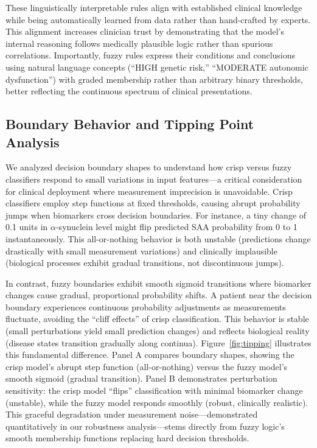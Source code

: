 \documentclass[conference]{IEEEtran}
\begin{document}
These linguistically interpretable rules align with established clinical knowledge while being automatically learned from data rather than hand-crafted by experts. This alignment increases clinician trust \cite{torres2006fuzzy} by demonstrating that the model's internal reasoning follows medically plausible logic rather than spurious correlations. Importantly, fuzzy rules express their conditions and conclusions using natural language concepts (``HIGH genetic risk,'' ``MODERATE autonomic dysfunction'') with graded membership rather than arbitrary binary thresholds, better reflecting the continuous spectrum of clinical presentations.

\subsection{Boundary Behavior and Tipping Point Analysis}

We analyzed decision boundary shapes to understand how crisp versus fuzzy classifiers respond to small variations in input features—a critical consideration for clinical deployment where measurement imprecision is unavoidable. Crisp classifiers employ step functions at fixed thresholds, causing abrupt probability jumps when biomarkers cross decision boundaries. For instance, a tiny change of 0.1 units in $\alpha$-synuclein level might flip predicted SAA probability from 0 to 1 instantaneously. This all-or-nothing behavior is both unstable (predictions change drastically with small measurement variations) and clinically implausible (biological processes exhibit gradual transitions, not discontinuous jumps).

In contrast, fuzzy boundaries exhibit smooth sigmoid transitions where biomarker changes cause gradual, proportional probability shifts. A patient near the decision boundary experiences continuous probability adjustments as measurements fluctuate, avoiding the ``cliff effects'' of crisp classification. This behavior is stable (small perturbations yield small prediction changes) and reflects biological reality (disease states transition gradually along continua). Figure~\ref{fig:tipping} illustrates this fundamental difference. Panel A compares boundary shapes, showing the crisp model's abrupt step function (all-or-nothing) versus the fuzzy model's smooth sigmoid (gradual transition). Panel B demonstrates perturbation sensitivity: the crisp model ``flips'' classification with minimal biomarker change (unstable), while the fuzzy model responds smoothly (robust, clinically realistic). This graceful degradation under measurement noise—demonstrated quantitatively in our robustness analysis—stems directly from fuzzy logic's smooth membership functions replacing hard decision thresholds.
\end{document}

